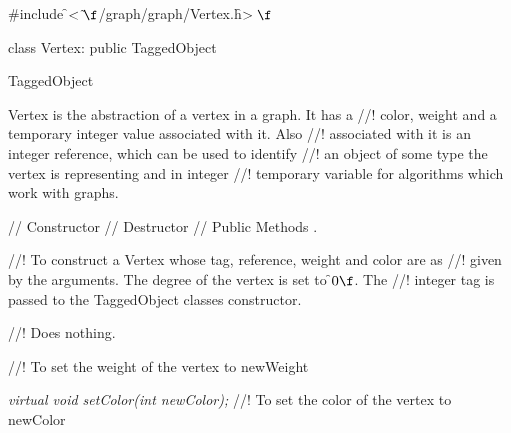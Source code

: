 
\indent \#include \f$<\tilde{ }\f$/graph/graph/Vertex.h\f$>\f$

\indent class Vertex: public TaggedObject

\indent TaggedObject
\indent{}

\indent Vertex is the abstraction of a vertex in a graph. It has a
//! color, weight and a temporary integer value associated with it. Also
//! associated with it is an integer reference, which can be used to identify
//! an object of some type the vertex is representing and in integer
//! temporary variable for algorithms which work with graphs.

\indent // Constructor
\indent // Destructor
\indent // Public Methods
.



//! To construct a Vertex whose tag, reference, weight and color are as
//! given by the arguments. The degree of the vertex is set to \f$0\f$. The
//! integer \p tag is passed to the TaggedObject classes constructor.

//! Does nothing.

//! To set the weight of the vertex to \p newWeight    

{\em virtual void setColor(int newColor);}
//! To set the color of the vertex to \p newColor    

